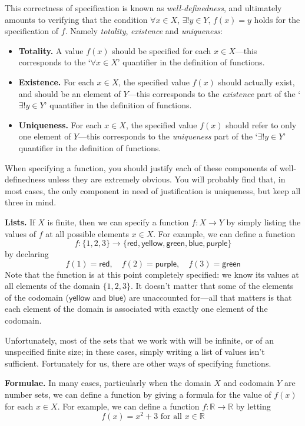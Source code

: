 This correctness of specification is known as \textit{well-definedness}, and ultimately amounts to verifying that the condition $\forall x \in X,\, \exists ! y \in Y,\, f(x)=y$ holds for the specification of $f$. Namely \textit{totality}, \textit{existence} and \textit{uniqueness}:
\begin{itemize}
\item \textbf{Totality.} A value $f(x)$ should be specified for each $x \in X$---this corresponds to the `$\forall x \in X$' quantifier in the definition of functions.
\item \textbf{Existence.} For each $x \in X$, the specified value $f(x)$ should actually exist, and should be an element of $Y$---this corresponds to the \textit{existence} part of the `$\exists ! y \in Y$' quantifier in the definition of functions.
\item \textbf{Uniqueness.} For each $x \in X$, the specified value $f(x)$ should refer to only one element of $Y$---this corresponds to the \textit{uniqueness} part of the `$\exists ! y \in Y$' quantifier in the definition of functions.
\end{itemize}

When specifying a function, you should justify each of these components of well-definedness unless they are extremely obvious. You will probably find that, in most cases, the only component in need of justification is uniqueness, but keep all three in mind.

\textbf{Lists.} If $X$ is finite, then we can specify a function $f : X \to Y$ by simply listing the values of $f$ at all possible elements $x \in X$. For example, we can define a function
\[ f : \{ 1, 2, 3 \} \to \{ \mathsf{red}, \mathsf{yellow}, \mathsf{green}, \mathsf{blue}, \mathsf{purple} \} \]
by declaring
\[ f(1) = \mathsf{red}, \quad f(2) = \mathsf{purple}, \quad f(3) = \mathsf{green} \]
Note that the function is at this point completely specified: we know its values at all elements of the domain $\{ 1, 2, 3 \}$. It doesn't matter that some of the elements of the codomain ($\mathsf{yellow}$ and $\mathsf{blue}$) are unaccounted for---all that matters is that each element of the domain is associated with exactly one element of the codomain.

Unfortunately, most of the sets that we work with will be infinite, or of an unspecified finite size; in these cases, simply writing a list of values isn't sufficient. Fortunately for us, there are other ways of specifying functions.

\textbf{Formulae.} In many cases, particularly when the domain $X$ and codomain $Y$ are number sets, we can define a function by giving a formula for the value of $f(x)$ for each $x \in X$. For example, we can define a function $f : \mathbb{R} \to \mathbb{R}$ by letting
\[ f(x) = x^2 + 3 \text{ for all } x \in \mathbb{R} \]

